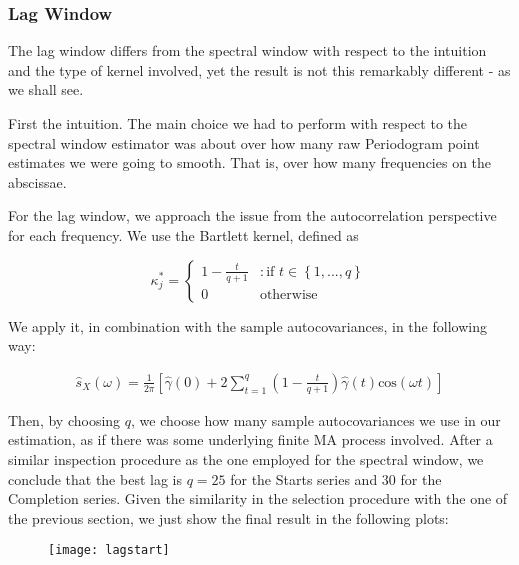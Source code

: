 \documentclass[12pt]{article} %
\begin{document}
\subsubsection{Lag Window}

The lag window differs from the spectral window with respect to the intuition and the type of kernel involved, yet the result is not this remarkably different - as we shall see.

First the intuition. The main choice we had to perform with respect to the spectral window estimator was about over how many raw Periodogram point estimates we were going to smooth. That is, over how many frequencies on the abscissae. 

For the lag window, we approach the issue from the autocorrelation perspective for each frequency. We use the Bartlett kernel, defined as

\begin{equation}
\kappa_j^*= \begin{cases}
     1-\frac{t}{q+1}  &: \text{if $t\in\left\{1,...,q\right\}$}\\
     0 &  \text{otherwise}   
\end{cases}
\end{equation}

We apply it, in combination with the sample autocovariances, in the following way:

\begin{equation}
\begin{aligned}
\hat{s}_X(\omega)=\frac{1}{2\pi}\left[\hat{\gamma}(0)+2\sum\limits_{t=1}^{q}\left( 1-\frac{t}{q+1}\right) \hat{\gamma}(t)\text{cos}(\omega t)\right]
\end{aligned}
\end{equation}

Then, by choosing $q$, we choose how many sample autocovariances we use in our estimation, as if there was some underlying finite MA process involved. After a similar inspection procedure as the one employed for the spectral window, we conclude that the best lag is $q=25$ for the Starts series and $30$ for the Completion series. Given the similarity in the selection procedure with the one of the previous section, we just show the final result in the following plots:


\begin{figure}[h!]
\begin{center}
\texttt{[image: lagstart]}
\caption{}
\end{center}
\end{figure}
\end{document}
